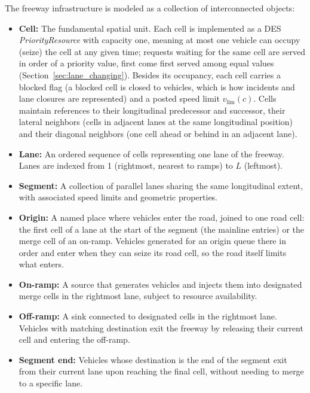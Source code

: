 \documentclass[review,number]{elsarticle}
\begin{document}
The freeway infrastructure is modeled as a collection of interconnected objects:

\begin{itemize}
    \item \textbf{Cell:} The fundamental spatial unit. Each cell is implemented as a DES \emph{PriorityResource} with capacity one, meaning at most one vehicle can occupy (seize) the cell at any given time; requests waiting for the same cell are served in order of a priority value, first come first served among equal values (Section~\ref{sec:lane_changing}). Besides its occupancy, each cell carries a blocked flag (a blocked cell is closed to vehicles, which is how incidents and lane closures are represented) and a posted speed limit $v_{\text{lim}}(c)$. Cells maintain references to their longitudinal predecessor and successor, their lateral neighbors (cells in adjacent lanes at the same longitudinal position) and their diagonal neighbors (one cell ahead or behind in an adjacent lane).

    \item \textbf{Lane:} An ordered sequence of cells representing one lane of the freeway. Lanes are indexed from 1 (rightmost, nearest to ramps) to $L$ (leftmost).

    \item \textbf{Segment:} A collection of parallel lanes sharing the same longitudinal extent, with associated speed limits and geometric properties.

    \item \textbf{Origin:} A named place where vehicles enter the road, joined to one road cell: the first cell of a lane at the start of the segment (the mainline entries) or the merge cell of an on-ramp. Vehicles generated for an origin queue there in order and enter when they can seize its road cell, so the road itself limits what enters.

    \item \textbf{On-ramp:} A source that generates vehicles and injects them into designated merge cells in the rightmost lane, subject to resource availability.

    \item \textbf{Off-ramp:} A sink connected to designated cells in the rightmost lane. Vehicles with matching destination exit the freeway by releasing their current cell and entering the off-ramp.

    \item \textbf{Segment end:} Vehicles whose destination is the end of the segment exit from their current lane upon reaching the final cell, without needing to merge to a specific lane.
\end{itemize}
\end{document}
